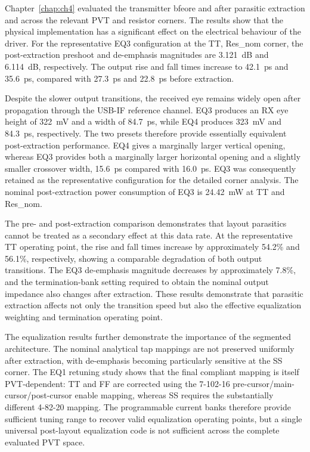 Chapter~\ref{chap:ch4} evaluated the transmitter bfeore and after parasitic extraction and across the relevant \ac{PVT} and resistor corners. The results show that the physical implementation has a significant effect on the electrical behaviour of the driver. For the representative EQ3 configuration at the \ac{TT}, Res\_nom corner, the post-extraction preshoot and de-emphasis magnitudes are 3.121~dB and 6.114~dB, respectively. The output rise and fall times increase to 42.1~ps and 35.6~ps, compared with 27.3~ps and 22.8~ps before extraction.

Despite the slower output transitions, the received eye remains widely open after propagation through the \ac{USB-IF} reference channel. EQ3 produces an \ac{RX} eye height of \SI{322}{\milli\volt} and a width of \SI{84.7}{\pico\second}, while EQ4 produces \SI{323}{\milli\volt} and \SI{84.3}{\pico\second}, respectively. The two presets therefore provide essentially equivalent post-extraction performance. EQ4 gives a marginally larger vertical opening, whereas EQ3 provides both a marginally larger horizontal opening and a slightly smaller crossover width, \SI{15.6}{\pico\second} compared with \SI{16.0}{\pico\second}. EQ3 was consequently retained as the representative configuration for the detailed corner analysis. The nominal post-extraction power consumption of EQ3 is \SI{24.42}{\milli\watt} at \ac{TT} and Res\_nom.

The pre- and post-extraction comparison demonstrates that layout parasitics cannot be treated as a secondary effect at this data rate. At the representative \ac{TT} operating point, the rise and fall times increase by approximately 54.2\% and 56.1\%, respectively, showing a comparable degradation of both output transitions. The EQ3 de-emphasis magnitude decreases by approximately 7.8\%, and the termination-bank setting required to obtain the nominal output impedance also changes after extraction. These results demonstrate that parasitic extraction affects not only the transition speed but also the effective equalization weighting and termination operating point.

The equalization results further demonstrate the importance of the segmented architecture. The nominal analytical tap mappings are not preserved uniformly after extraction, with de-emphasis becoming particularly sensitive at the \ac{SS} corner. The EQ1 retuning study shows that the final compliant mapping is itself \ac{PVT}-dependent: \ac{TT} and \ac{FF} are corrected using the 7-102-16 pre-cursor/main-cursor/post-cursor enable mapping, whereas \ac{SS} requires the substantially different 4-82-20 mapping. The programmable current banks therefore provide sufficient tuning range to recover valid equalization operating points, but a single universal post-layout equalization code is not sufficient across the complete evaluated \ac{PVT} space.

